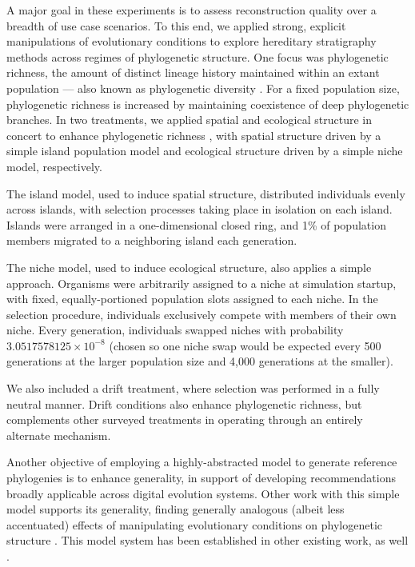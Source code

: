 A major goal in these experiments is to assess reconstruction quality over a breadth of use case scenarios.
To this end, we applied strong, explicit manipulations of evolutionary conditions to explore hereditary stratigraphy methods across regimes of phylogenetic structure.
One focus was phylogenetic richness, the amount of distinct lineage history maintained within an extant population --- also known as phylogenetic diversity \citep{tucker2017guide}.
For a fixed population size, phylogenetic richness is increased by maintaining coexistence of deep phylogenetic branches.
In two treatments, we applied spatial and ecological structure in concert to enhance phylogenetic richness \citep{moreno2024ecology,gomez2019understanding,valiente2007facilitation}, with spatial structure driven by a simple island population model and ecological structure driven by a simple niche model, respectively.

The island model, used to induce spatial structure, distributed individuals evenly across islands, with selection processes taking place in isolation on each island.
Islands were arranged in a one-dimensional closed ring, and 1\% of population members migrated to a neighboring island each generation.

The niche model, used to induce ecological structure, also applies a simple approach.
Organisms were arbitrarily assigned to a niche at simulation startup, with fixed, equally-portioned population slots assigned to each niche.
In the selection procedure, individuals exclusively compete with members of their own niche.
Every generation, individuals swapped niches with probability $3.0517578125 \times 10^{-8}$ (chosen so one niche swap would be expected every 500 generations at the larger population size and 4,000 generations at the smaller).

We also included a drift treatment, where selection was performed in a fully neutral manner.
Drift conditions also enhance phylogenetic richness, but complements other surveyed treatments in operating through an entirely alternate mechanism.

Another objective of employing a highly-abstracted model to generate reference phylogenies is to enhance generality, in support of developing recommendations broadly applicable across digital evolution systems.
Other work with this simple model supports its generality, finding generally analogous (albeit less accentuated) effects of manipulating evolutionary conditions on phylogenetic structure \citep{moreno2024ecology}.
This model system has been established in other existing work, as well \citep{moreno2023toward}.

